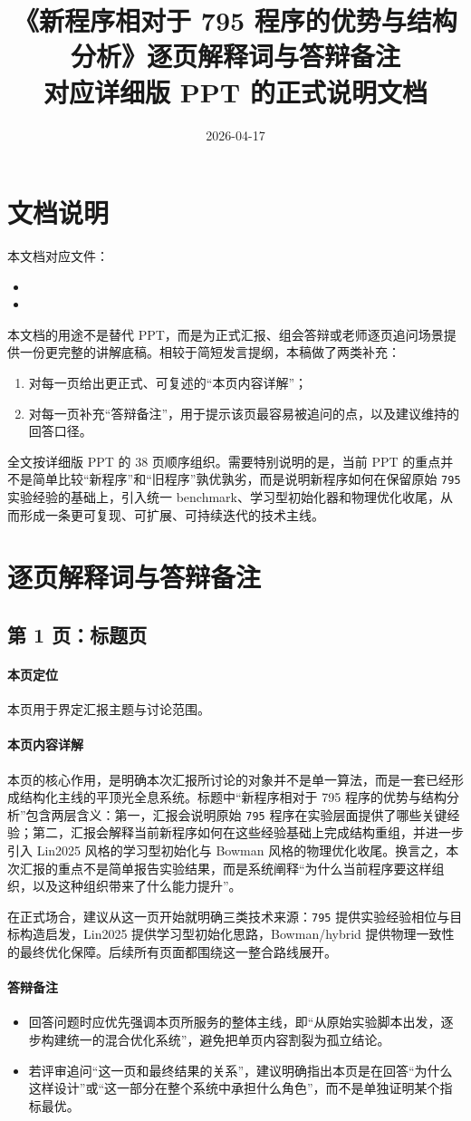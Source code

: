 \documentclass[12pt,a4paper]{ctexart}
\title{《新程序相对于 795 程序的优势与结构分析》逐页解释词与答辩备注\\
\large 对应详细版 PPT 的正式说明文档}
\author{}
\date{2026-04-17}
\newcommand{\pageentry}[4]{
\subsection{第 #1 页：#2}

\paragraph{本页定位}
#3

\paragraph{本页内容详解}
#4

\paragraph{答辩备注}
\begin{itemize}
\item 回答问题时应优先强调本页所服务的整体主线，即“从原始实验脚本出发，逐步构建统一的混合优化系统”，避免把单页内容割裂为孤立结论。
\item 若评审追问“这一页和最终结果的关系”，建议明确指出本页是在回答“为什么这样设计”或“这一部分在整个系统中承担什么角色”，而不是单独证明某个指标最优。
\end{itemize}
}
\begin{document}
\maketitle
\tableofcontents
\newpage

\section{文档说明}

本文档对应文件：
\begin{itemize}
\item {}
\item {}
\end{itemize}

本文档的用途不是替代 PPT，而是为正式汇报、组会答辩或老师逐页追问场景提供一份更完整的讲解底稿。相较于简短发言提纲，本稿做了两类补充：
\begin{enumerate}[label=\arabic*.]
\item 对每一页给出更正式、可复述的“本页内容详解”；
\item 对每一页补充“答辩备注”，用于提示该页最容易被追问的点，以及建议维持的回答口径。
\end{enumerate}

全文按详细版 PPT 的 38 页顺序组织。需要特别说明的是，当前 PPT 的重点并不是简单比较“新程序”和“旧程序”孰优孰劣，而是说明新程序如何在保留原始 \texttt{795} 实验经验的基础上，引入统一 benchmark、学习型初始化器和物理优化收尾，从而形成一条更可复现、可扩展、可持续迭代的技术主线。

\section{逐页解释词与答辩备注}

\pageentry{1}{标题页}{
本页用于界定汇报主题与讨论范围。
}{
本页的核心作用，是明确本次汇报所讨论的对象并不是单一算法，而是一套已经形成结构化主线的平顶光全息系统。标题中“新程序相对于 795 程序的优势与结构分析”包含两层含义：第一，汇报会说明原始 \texttt{795} 程序在实验层面提供了哪些关键经验；第二，汇报会解释当前新程序如何在这些经验基础上完成结构重组，并进一步引入 Lin2025 风格的学习型初始化与 Bowman 风格的物理优化收尾。换言之，本次汇报的重点不是简单报告实验结果，而是系统阐释“为什么当前程序要这样组织，以及这种组织带来了什么能力提升”。

在正式场合，建议从这一页开始就明确三类技术来源：\texttt{795} 提供实验经验相位与目标构造启发，Lin2025 提供学习型初始化思路，Bowman/hybrid 提供物理一致性的最终优化保障。后续所有页面都围绕这一整合路线展开。
}
\end{document}
